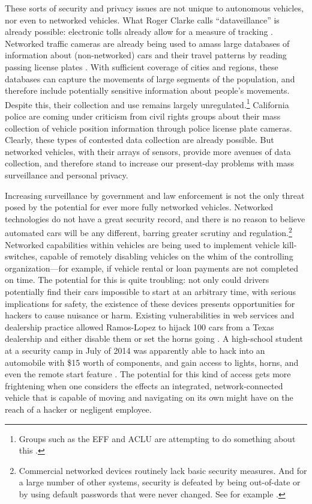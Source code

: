 
These sorts of security and privacy issues are not unique to
autonomous vehicles, nor even to networked vehicles. What Roger Clarke
calls ``dataveillance'' is already possible: electronic tolls already
allow for a measure of tracking \cite[p. 25]{nissenbaum}. Networked traffic cameras are
already being used to amass large databases of information about
(non-networked) cars and their travel patterns by reading passing
license plates \cite[p. 26]{nissenbaum}. With sufficient coverage of cities and regions,
these databases can capture the movements of large segments of the
population, and therefore include potentially sensitive information
about people's movements. Despite this, their collection and use
remains largely unregulated.\footnote{Groups such as the EFF and ACLU
  are attempting to do something about this \cite{kayyaliEFF}.}
California police are coming under 
criticism from civil rights groups about their mass collection of
vehicle position information through police license plate cameras.\cite{maassCivil}
Clearly, these types of contested data collection are already
possible. But networked vehicles, with their arrays of sensors,
provide more avenues of data collection, and therefore stand to
increase our present-day problems with mass surveillance and personal
privacy.

Increasing surveillance by government and law enforcement is not the
only threat posed by the potential for ever more fully networked
vehicles. Networked technologies do not have a great security record,
and there is no reason to believe automated cars will be any
different, barring greater scrutiny and
regulation.\footnote{Commercial networked devices routinely lack basic
security measures. And for a large number of other systems, security
is defeated by being out-of-date or by using default passwords that
were never changed. See for example \cite{zetter}.}
Networked capabilities within vehicles are being used to
implement vehicle kill-switches, capable of remotely disabling
vehicles on the whim of the controlling organization---for example, if
vehicle rental or loan payments are not completed on time. The
potential for this is quite troubling: not only could drivers
potentially find their cars impossible to start at an arbitrary time,
with serious implications for safety, the existence of these devices
presents opportunities for hackers to cause nuisance or
harm.\cite{goodman}
Existing vulnerabilities in web services and dealership practice
allowed Ramos-Lopez to hijack 100 cars from a Texas dealership and
either disable them or set
the horns
going \cite{poulsenHacker}. A
high-school student at a security camp in July of 2014 was apparently
able to hack into an automobile with \$15 worth of components, and
gain access to lights, horns, and even the remote start
feature \cite{bigelow14}.
The
potential for this kind of access gets more frightening when one
considers the effects an integrated, network-connected vehicle that is capable of
moving and navigating on its own might have on the reach of a hacker or negligent employee.

